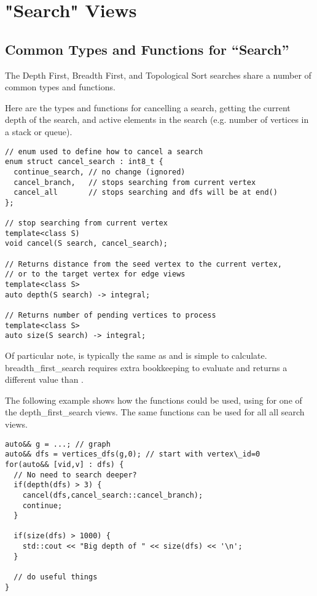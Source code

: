 \section{"Search" Views}

\subsection{Common Types and Functions for ``Search'' }

The Depth First, Breadth First, and Topological Sort searches share a number of common types and functions. 

Here are the types and functions for cancelling a search, getting the current depth of the search, and active elements in the search (e.g. number of vertices in a stack or queue).
\begin{lstlisting}
// enum used to define how to cancel a search
enum struct cancel_search : int8_t { 
  continue_search, // no change (ignored)
  cancel_branch,   // stops searching from current vertex
  cancel_all       // stops searching and dfs will be at end()
};

// stop searching from current vertex
template<class S)
void cancel(S search, cancel_search);

// Returns distance from the seed vertex to the current vertex, 
// or to the target vertex for edge views
template<class S>
auto depth(S search) -> integral;

// Returns number of pending vertices to process
template<class S>
auto size(S search) -> integral; 
\end{lstlisting}

Of particular note,  is typically the same as  and is simple to calculate. breadth\_first\_search requires extra bookkeeping to evaluate  and returns a different value than .

The following example shows how the functions  could be used, using  for one of the depth\_first\_search views. The same functions can be used for all all search views.
\begin{lstlisting}
auto&& g = ...; // graph
auto&& dfs = vertices_dfs(g,0); // start with vertex\_id=0
for(auto&& [vid,v] : dfs) {
  // No need to search deeper?
  if(depth(dfs) > 3) {
    cancel(dfs,cancel_search::cancel_branch);
    continue;
  }
  
  if(size(dfs) > 1000) {
    std::cout << "Big depth of " << size(dfs) << '\n';
  }
  
  // do useful things
}
\end{lstlisting}

